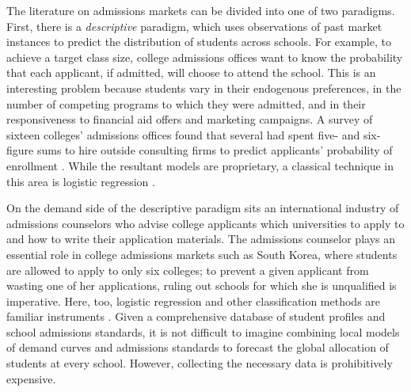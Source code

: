 \documentclass[12pt]{article}
\numberwithin{equation}{subsection}
\theoremstyle{definition}
\begin{document}
The literature on admissions markets can be divided into one of two paradigms. First, there is a \emph{descriptive} paradigm, which uses observations of past market instances to predict the distribution of students across schools. For example, to achieve a target class size, college admissions offices want to know the probability that each applicant, if admitted, will choose to attend the school. This is an interesting problem because students vary in their endogenous preferences, in the number of competing programs to which they were admitted, and in their responsiveness to financial aid offers and marketing campaigns. A survey of sixteen colleges' admissions offices found that several had spent five- and six-figure sums to hire outside consulting firms to predict applicants' probability of enrollment \parencite[][]{estimatingapplications}. While the resultant models are proprietary, a classical technique in this area is logistic regression \parencite[][]{understandingandpredictingtheyield}.
 
On the demand side of the descriptive paradigm sits an international industry of admissions counselors who advise college applicants which universities to apply to and how to write their application materials. The admissions counselor plays an essential role in college admissions markets such as South Korea, where students are allowed to apply to only six colleges; to prevent a given applicant from wasting one of her applications, ruling out schools for which she is unqualified is imperative. Here, too, logistic regression and other classification methods are familiar instruments \parencite[][]{asimulationapproachtopredictingcollegeadmissions}. Given a comprehensive database of student profiles and school admissions standards, it is not difficult to imagine combining local models of demand curves and admissions standards to forecast the global allocation of students at every school. However, collecting the necessary data is prohibitively expensive. %
\end{document}
